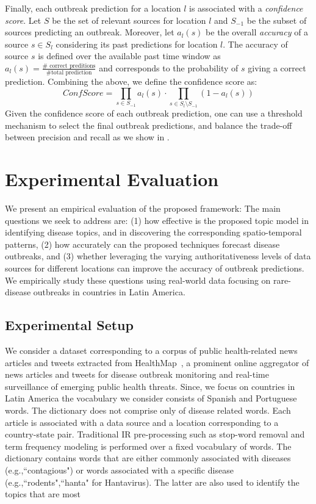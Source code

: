 \documentclass[conference]{IEEEtran}
\begin{document}
Finally, each outbreak prediction for a location $l$ is associated with a {\em confidence score}. Let $S$ be the set of relevant sources for location $l$ and $S_{-1}$ be the subset of sources predicting an outbreak. Moreover, let $a_l(s)$ be the overall {\em accuracy} of a source $s \in S_l$ considering its past predictions for location $l$. The accuracy of source $s$ is defined over the available past time window as $a_l(s) = \frac{\#\mbox{ correct preditions}}{\#\mbox{total prediction}}$ and corresponds to the probability of $s$ giving a correct prediction. Combining the above, we define the confidence score as: 
\begin{equation}
ConfScore = \prod_{s \in S_{-1}}a_l(s) \cdot \prod_{s \in S_l \setminus S_{-1}} (1 - a_l(s))
\label{eq:conf}
\end{equation}
Given the confidence score of each outbreak prediction, one can use a threshold mechanism to select the final outbreak predictions, and balance the trade-off between precision and recall as we show in . 

\section{Experimental Evaluation}
\label{sec:exp}
We present an empirical evaluation of the proposed framework: The main questions we seek to address are: (1) how effective is the proposed topic model in identifying disease topics, and in discovering the corresponding spatio-temporal patterns, (2) how accurately can the proposed techniques forecast disease outbreaks, and (3) whether leveraging the varying authoritativeness levels of data sources for different locations can improve the accuracy of outbreak predictions. We empirically study these questions using real-world data focusing on rare-disease outbreaks in countries in Latin America.

\subsection{Experimental Setup}
 We consider a dataset corresponding to a corpus of public health-related news articles and tweets extracted from HealthMap~\cite{healthmap}, a prominent online aggregator of news articles and tweets for disease outbreak monitoring and real-time surveillance of emerging public health threats. Since, we focus on countries in Latin America the vocabulary we consider consists of Spanish and Portuguese words. The dictionary does not comprise only of disease related words.  Each article is associated with a data source and a location corresponding to a country-state pair. Traditional IR pre-processing such as stop-word removal and term frequency modeling is performed over a fixed vocabulary of words. The dictionary contains words that are either commonly associated with diseases (e.g.,``contagious") or words associated with a specific disease (e.g.,``rodents",``hanta" for Hantavirus). The latter are also used to identify the topics that are most 
\end{document}
